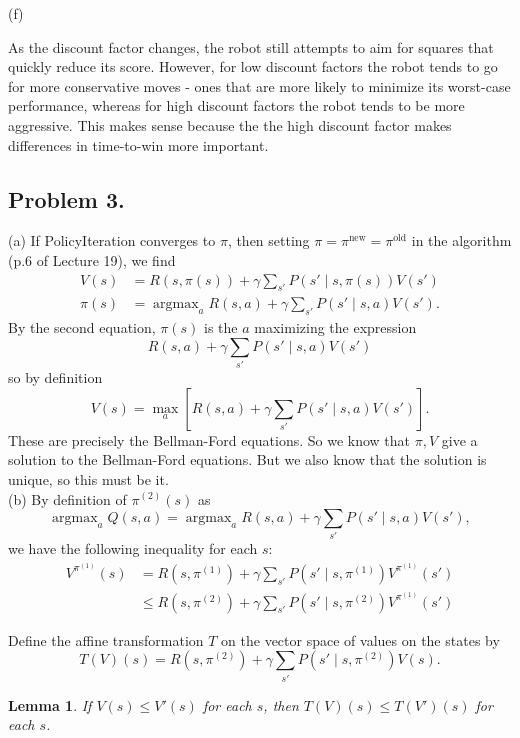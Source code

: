 \documentclass[12pt]{article}
\DeclareMathOperator{\argmax}{argmax}
\newtheorem{lemma}[thm]{Lemma}
\theoremstyle{remark}
\begin{document}
(f)

As the discount factor changes, the robot still attempts to aim for squares that quickly reduce its score. However, for low discount factors the robot tends to go for more conservative moves - ones that are more likely to minimize its worst-case performance, whereas for high discount factors the robot tends to be more aggressive. This makes sense because the the high discount factor makes differences in time-to-win more important.



\subsection*{Problem 3.}(a) If PolicyIteration converges to $\pi$, then setting $\pi = \pi^{\text{new}} = \pi^{\text{old}}$ in the algorithm (p.6 of Lecture 19), we find
\begin{align*}
V(s) &= R(s, \pi(s)) + \gamma \sum_{s'} P(s' \mid s, \pi(s)) V(s') \\
\pi(s) &= \argmax_a R(s,a) + \gamma \sum_{s'} P(s' \mid s,a) V(s').
\end{align*}
By the second equation, $\pi(s)$ is the $a$ maximizing the expression 
\[
R(s, a) + \gamma \sum_{s'} P(s' \mid s, a) V(s')
\]
so by definition 
\[
V(s) = \max_a \left[ R(s,a) + \gamma \sum_{s'} P(s' \mid s,a) V(s') \right].
\]
These are precisely the Bellman-Ford equations. So we know that $\pi,V$ give a solution to the Bellman-Ford equations. But we also know that the solution is unique, so this must be it. \\

\noindent (b) By definition of $\pi^{(2)}(s)$ as 
\[
\argmax_a Q(s,a) = \argmax_a R(s,a) + \gamma \sum_{s'} P(s' \mid s,a) V(s'),
\]
we have the following inequality for each $s$:
\begin{align}
V^{\pi^{(1)}} (s) &= R(s, \pi^{(1)}) + \gamma \sum_{s'} P(s' \mid s, \pi^{(1)} ) V^{\pi^{(1)}}(s') \\
&\leq R(s, \pi^{(2)}) + \gamma \sum_{s'} P(s' \mid s, \pi^{(2)} ) V^{\pi^{(1)}}(s') \label{3eq1}
\end{align}

Define the affine transformation $T$ on the vector space of values on the states by 
\[
T(V)(s) =  R(s, \pi^{(2)}) + \gamma \sum_{s'} P(s' \mid s, \pi^{(2)} ) V(s).
\]
\begin{lemma}
If $V(s) \leq V'(s)$ for each $s$, then $T(V)(s) \leq T(V')(s)$ for each $s$. 
\end{lemma}
\end{document}
